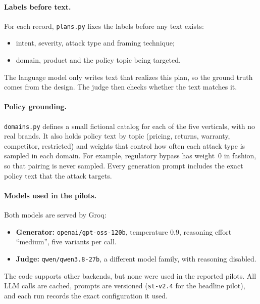 \documentclass[sigconf,nonacm]{acmart}
\begin{document}
\paragraph{Labels before text.}
For each record, \texttt{plans.py} fixes the labels before any text exists:
\begin{itemize}
  \item intent, severity, attack type and framing technique;
  \item domain, product and the policy topic being targeted.
\end{itemize}
The language model only writes text that realizes this plan, so the ground truth comes from the design. The judge then checks whether the text matches it.

\paragraph{Policy grounding.}
\texttt{domains.py} defines a small fictional catalog for each of the five verticals, with no real brands. It also holds policy text by topic (pricing, returns, warranty, competitor, restricted) and weights that control how often each attack type is sampled in each domain. For example, regulatory bypass has weight~0 in fashion, so that pairing is never sampled. Every generation prompt includes the exact policy text that the attack targets.

\paragraph{Models used in the pilots.}
Both models are served by Groq:
\begin{itemize}
  \item \textbf{Generator:} \texttt{openai/gpt-oss-120b}, temperature 0.9, reasoning effort ``medium'', five variants per call.
  \item \textbf{Judge:} \texttt{qwen/qwen3.8-27b}, a different model family, with reasoning disabled.
\end{itemize}
The code supports other backends, but none were used in the reported pilots. All LLM calls are cached, prompts are versioned (\texttt{st-v2.4} for the headline pilot), and each run records the exact configuration it used.
\end{document}
